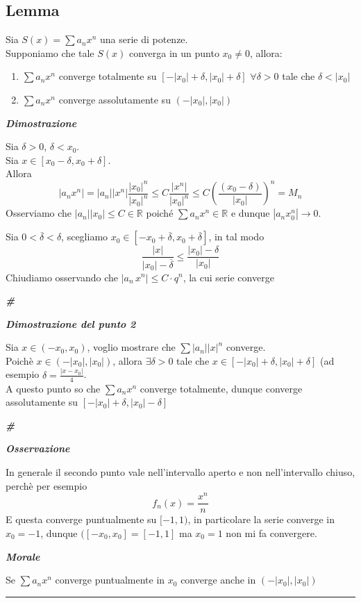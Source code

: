 \documentclass{article}
\theoremstyle{definition}
\newcommand{\linea}{\vspace{15pt}\hrule\vspace{15pt}}
\newcommand{\R}{\mathbb{R}}
\newcommand{\cvd}{\begin{center} \textbf{\textit{\#}} \end{center}}
\begin{document}
\subsection{Lemma}
Sia $S(x)= \sum a_nx^n$ una serie di potenze.
\\
Supponiamo che tale $S(x)$ converga in un punto $x_0 \neq 0$, allora:
\begin{enumerate}
    \item $\sum a_nx^n$ converge totalmente su $[-|x_0|+\delta , |x_0|+\delta]$ $\forall \delta > 0$ tale che $\delta < |x_0|$
    \item $\sum a_nx^n$ converge assolutamente su $(-|x_0|, |x_0|)$
\end{enumerate}
\begin{center}
    \textbf{\textit{Dimostrazione}}
\end{center}
Sia $\delta > 0$, $\delta < x_0$.
\\
Sia $x \in [x_0-\delta, x_0+\delta]$.
\\
Allora
\begin{equation}
    |a_nx^n|=|a_n||x^n|\frac{|x_0|^n}{|x_0|^n} \leqslant C \frac{|x^n|}{|x_0|^n} \leqslant C \left(\frac{(x_0-\delta)}{|x_0|}\right)^n =M_n
\end{equation}
Osserviamo che $|a_n||x_0| \leqslant C \in \R$ poiché $\sum a_nx^n \in \R$ e dunque $|a_nx_0^n| \to 0$.

Sia $0 < \overline{\delta} < \delta$, scegliamo $x_0 \in \left[-x_0+\overline{\delta}, x_0 + \overline{\delta}\right]$, in tal modo
\begin{equation}
    \frac{|x|}{|x_0|-\overline{\delta}} \leqslant \frac{|x_0|-\delta}{|x_0|}
\end{equation}
Chiudiamo osservando che $|a_n\, x^n| \leqslant C \cdot q^n$, la cui serie converge
\cvd
\begin{center}
    \textbf{\textit{Dimostrazione del punto 2}}
\end{center}
Sia $x \in (-x_0,x_0)$, voglio mostrare che $\sum |a_n||x|^n$ converge.
\\
Poichè $x \in (-|x_0|,|x_0|)$, allora $\exists \delta > 0$ tale che $x \in [-|x_0|+\delta, |x_0|+\delta]$ (ad esempio $\delta=\frac{|x-x_0|}{4}$.
\\
A questo punto so che $\sum a_nx^n$ converge totalmente, dunque converge assolutamente su $[-|x_0|+\delta, |x_0|-\delta]$
\cvd

\begin{center}
    \textbf{\textit{Osservazione}}
\end{center}
In generale il secondo punto vale nell'intervallo aperto e non nell'intervallo chiuso, perchè per esempio
\begin{equation}
    f_n(x)=\frac{x^n}{n}
\end{equation}
E questa converge puntualmente su $[-1,1)$, in particolare la serie converge in $x_0=-1$, dunque $([-x_0,x_0]=[-1,1]$ ma $x_0=1$ non mi fa convergere.
\begin{center}
    \textbf{\textit{Morale}}
\end{center}
Se $\sum a_nx^n$ converge puntualmente in $x_0$ converge anche in $(-|x_0|,|x_0|)$
\linea
\end{document}
